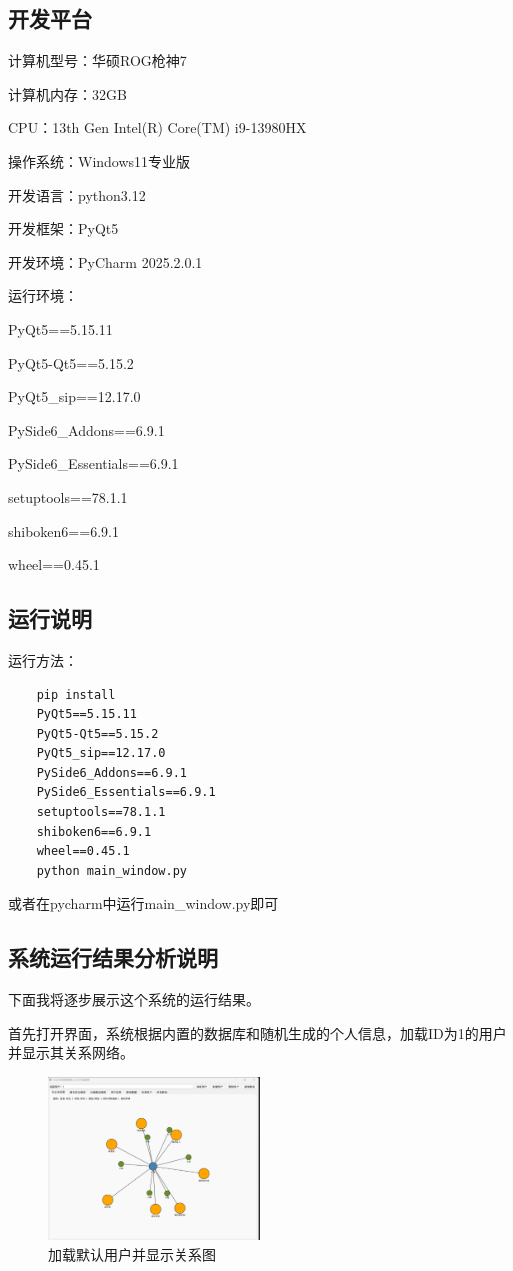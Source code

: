 \documentclass[12pt,a4paper]{article}
\begin{document}
\subsection{开发平台}

计算机型号：华硕ROG枪神7

计算机内存：32GB

CPU：13th Gen Intel(R) Core(TM) i9-13980HX

操作系统：Windows11专业版

开发语言：python3.12

开发框架：PyQt5

开发环境：PyCharm 2025.2.0.1

运行环境：

PyQt5==5.15.11

PyQt5-Qt5==5.15.2

PyQt5\_sip==12.17.0

PySide6\_Addons==6.9.1

PySide6\_Essentials==6.9.1

setuptools==78.1.1

shiboken6==6.9.1

wheel==0.45.1

\subsection{运行说明}

运行方法：
\begin{verbatim}
    pip install 
    PyQt5==5.15.11
    PyQt5-Qt5==5.15.2
    PyQt5_sip==12.17.0
    PySide6_Addons==6.9.1
    PySide6_Essentials==6.9.1
    setuptools==78.1.1
    shiboken6==6.9.1
    wheel==0.45.1
    python main_window.py
\end{verbatim}

或者在pycharm中运行main\_window.py即可

\subsection{系统运行结果分析说明}

下面我将逐步展示这个系统的运行结果。

首先打开界面，系统根据内置的数据库和随机生成的个人信息，加载ID为1的用户并显示其关系网络。

\begin{figure}[H]
    \centering
    \includegraphics[width=0.5\textwidth]{pt2-10.png}
    \caption{加载默认用户并显示关系图}
\end{figure}
\end{document}
